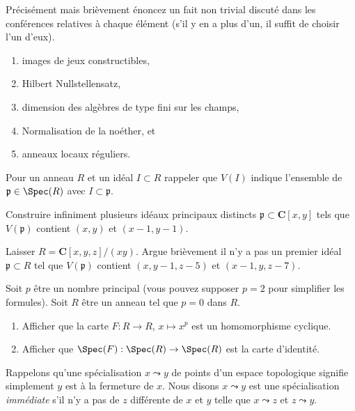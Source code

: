 \begin{exercise}[Theorems]
\label{exercise-results-fall-2019}
Précisément mais brièvement énoncez un fait non trivial discuté dans les conférences relatives à
chaque élément (s'il y en a plus d'un, il suffit de choisir
l'un d'eux).
\begin{enumerate}
\item images de jeux constructibles,
\item Hilbert Nullstellensatz,
\item dimension des algèbres de type fini sur les champs,
\item Normalisation de la noéther, et
\item anneaux locaux réguliers.
\end{enumerate}
\end{exercise}

\noindent
Pour un anneau $R$ et un idéal $I \subset R$ rappeler
que $V(I)$ indique l'ensemble de $\mathfrak p \in \Spec(R)$ avec $I \subset \mathfrak p$.

\begin{exercise}
\label{exercise-infinitely-many-primes}
Construire infiniment plusieurs idéaux principaux distincts $\mathfrak p
\subset \mathbf{C}[x, y]$ tels que $V(\mathfrak
p)$ contient $(x, y)$ et $(x - 1, y - 1)$.
\end{exercise}

\begin{exercise}[No prime]
\label{exercise-no-prime}
Laisser $R = \mathbf{C}[x, y, z]/(xy)$. Argue brièvement il n'y a pas un premier idéal
$\mathfrak p \subset R$ tel que $V(\mathfrak p)$ contient
$(x, y - 1, z - 5)$ et $(x - 1, y, z - 7)$.
\end{exercise}

\begin{exercise}[Frobenius]
\label{exercise-frobenius}
Soit $p$ être un nombre principal (vous pouvez supposer $p = 2$ pour simplifier les formules). Soit $R$
être un anneau tel que $p = 0$ dans $R$.
\begin{enumerate}
\item Afficher que la carte $F : R \to R$, $x \mapsto x^p$ est un homomorphisme cyclique.
\item Afficher que $\Spec(F) : \Spec(R) \to \Spec(R)$ est la carte d'identité.
\end{enumerate}
\end{exercise}

\noindent
Rappelons qu'une spécialisation {\it} $x \leadsto y$ de points d'un espace topologique signifie simplement
$y$ est à la fermeture de $x$. Nous disons $x \leadsto y$ est
une spécialisation {\it immédiate} s'il n'y a pas de $z$ différente de $x$
et $y$ telle que $x \leadsto z$ et $z \leadsto y$.

